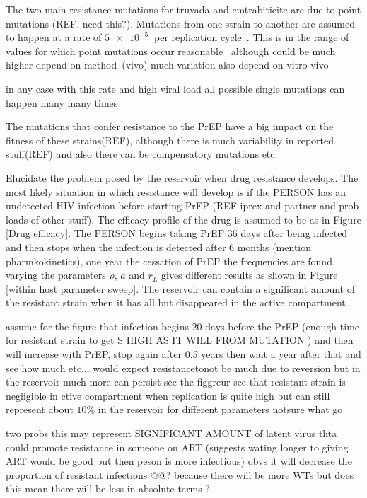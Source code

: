 \documentclass[DIV=15]{scrartcl}
\begin{document}
The two main resistance mutations for truvada and emtrabiticite are due to point mutations (REF, need this?). Mutations from one strain to another are assumed to happen at a rate of $\SI{5e-5}{}$ per replication cycle~\cite{gao2004}. This is in the range of values for which point mutations occur reasonable~\cite{abram2010}
although could be much higher depend on method~\cite{cuevas2015}(vivo) much variation also depend on vitro vivo

in any case with this rate  and high viral load all possible single mutations can happen many many times~\cite{coffin1995}

The mutations that confer resistance to the PrEP have a big impact on the fitness of these strains(REF), although there is much variability in reported stuff(REF) and also there can be compensatory mutations etc.


Elucidate the problem posed by the reservoir when drug resistance develops. The  most likely situation in which resistance will develop is  if  the PERSON has an undetected HIV infection before starting PrEP (REF iprex and partner and prob loads of  other stuff). The efficacy profile of the drug is assumed to be as in Figure \ref{Drug efficacy}. The PERSON begins taking PrEP $36$ days after being infected and then stops when the infection is detected after $6$ months (mention pharmkokinetics), one year the cessation  of PrEP the frequencies are found. varying the parameters $\rho$, $a$ and $r_L$ 
gives different results as shown in Figure \ref{within host parameter sweep}. The reservoir can contain a significant amount of the resistant strain when it has all   but disappeared in the active compartment.

assume for the figure that infection begins 
$20$ days before the PrEP (enough time for resistant strain to get S HIGH AS IT WILL  FROM MUTATION 	)  and then will  increase with PrEP, stop again  after 0.5  years then wait a year after that and see how much etc...      would expect resistancetonot be much due to  reversion but in the reservoir much more can persist see the figgreur
see that resistant strain is negligible in ctive compartment when replication  is quite high but can still  represent about $10\%$ in the reservoir for different parameters notsure  what go 

two  probs this may represent  SIGNIFICANT AMOUNT 	of latent virus thta could promote resistance in someone on ART (suggests wating longer to giving ART would be good but then peson is  more  infectious) obvs it will  decrease the proportion of resistant infections @@? because there will be more  WTs  but does  this mean there will be less in absolute terms ?
\end{document}
